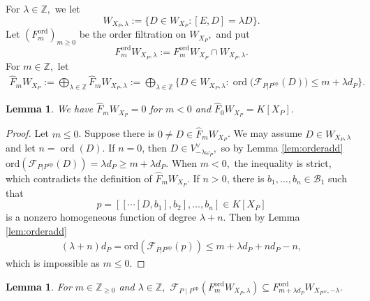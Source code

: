 \documentclass[11pt,a4paper,usenames,dvipsnames,reqno]{amsart}
\numberwithin{equation}{section}
\newcommand{\zz}{\mathbb Z}
\newtheorem{Lem}[Thm]{Lemma}
\theoremstyle{definition}
\theoremstyle{remark}
\begin{document}
For $\lambda\in \zz,$ we let $$W_{X_P,\lambda}:=\{D\in W_{X_P}: [E,D]=\lambda D\}.$$ 
Let $(F_m^{\mathrm{ord}})_{m\ge 0}$ be the order filtration on $W_{X_P},$ and put $$F_m^{\mathrm{ord}}W_{X_P,\lambda}:=F_m^{\mathrm{ord}}W_{X_P}\cap W_{X_P,\lambda}.$$
For $m\in \zz,$ let 
\begin{align*}
    \widehat{F}_mW_{X_P}:=\bigoplus_{\lambda\in \zz}  \widehat{F}_mW_{X_P,\lambda}:=\bigoplus_{\lambda\in \zz}\{ D\in W_{X_P,\lambda}:  \operatorname{ord}\bigl(\mathcal{F}_{P|P^{\mathrm{op}}}(D)\bigr)
\le m+\lambda d_P\big\}.
\end{align*}

\begin{Lem}\label{lem:=0}
    We have $\widehat{F}_mW_{X_P}=0$ for $m<0$ and $\widehat{F}_0W_{X_P}= K[X_P].$
\end{Lem}

\begin{proof}
    Let $m\le 0$.  Suppose there is $0\neq D\in\widehat{F}_m W_{X_P}$. We may assume $D\in W_{X_P,\lambda}$ and let \(n=\operatorname{ord}(D)\). If $n=0$, then $D\in V_{-\lambda\omega_P}^\lor,$ so by Lemma \ref{lem:orderadd} $\mathrm{ord}(\mathcal{F}_{P|P^{\mathrm{op}}}(D))=\lambda d_P\ge m+\lambda d_P.$ When $m<0,$ the inequality is strict, which contradicts the definition of $\widehat{F}_m W_{X_P}.$ If \(n>0\), there is $b_1,\ldots,b_n\in \mathcal{B}_1$ such that 
$$
p=[[\cdots[D,b_1],b_2],\dots,b_n]\in K[X_P]
$$
is a nonzero homogeneous function of degree $\lambda+n$. Then by Lemma \ref{lem:orderadd}
\begin{align*}
(\lambda+n)d_P=\mathrm{ord} (\mathcal{F}_{P|P^{\mathrm{op}}}(p))\le
m+\lambda d_P+nd_P-n,
\end{align*}
which is impossible as $m\le 0$.
\end{proof}


\begin{Lem}\label{lem:map}
For $m\in \zz_{\ge 0}$ and $\lambda\in \zz,$  $\mathcal F_{P\mid P^{\mathrm{op}}}
\left(F_m^{\mathrm{ord}}W_{X_P,\lambda}\right)
\subseteq
F_{m+\lambda d_P}^{\mathrm{ord}}W_{X_{P^{\mathrm{op}}},-\lambda}.$
\end{Lem}
\end{document}
